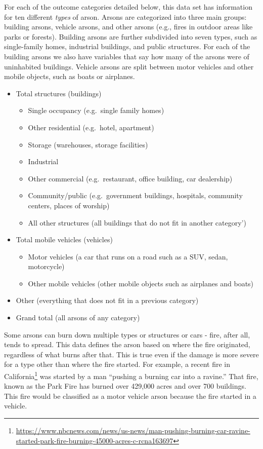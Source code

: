 \documentclass[
]{krantz}
\providecommand{\tightlist}{%
  \setlength{\itemsep}{0pt}\setlength{\parskip}{0pt}}
\renewcommand{\href}[2]{#2\footnote{\url{#1}}}
\begin{document}
For each of the outcome categories detailed below, this
data set has information for ten different \emph{types} of
arson. Arsons are categorized into three main groups:
building arsons, vehicle arsons, and other arsons (e.g.,
fires in outdoor areas like parks or forests). Building
arsons are further subdivided into seven types, such as
single-family homes, industrial buildings, and public
structures. For each of the building arsons we also have
variables that say how many of the arsons were of
uninhabited buildings. Vehicle arsons are split between
motor vehicles and other mobile objects, such as boats or
airplanes.

\begin{itemize}
\tightlist
\item
  Total structures (buildings)

  \begin{itemize}
  \tightlist
  \item
    Single occupancy (e.g.~single family homes)
  \item
    Other residential (e.g.~hotel, apartment)
  \item
    Storage (warehouses, storage facilities)
  \item
    Industrial
  \item
    Other commercial (e.g.~restaurant, office building, car
    dealership)
  \item
    Community/public (e.g.~government buildings, hospitals,
    community centers, places of worship)
  \item
    All other structures (all buildings that do not fit in
    another category')
  \end{itemize}
\item
  Total mobile vehicles (vehicles)

  \begin{itemize}
  \tightlist
  \item
    Motor vehicles (a car that runs on a road such as a SUV,
    sedan, motorcycle)
  \item
    Other mobile vehicles (other mobile objects such as
    airplanes and boats)
  \end{itemize}
\item
  Other (everything that does not fit in a previous
  category)
\item
  Grand total (all arsons of any category)
\end{itemize}

Some arsons can burn down multiple types or structures or
cars - fire, after all, tends to spread. This data defines
the arson based on where the fire originated, regardless of
what burns after that. This is true even if the damage is
more severe for a type other than where the fire started.
For example, a
\href{https://www.nbcnews.com/news/us-news/man-pushing-burning-car-ravine-started-park-fire-burning-45000-acres-c-rcna163697}{recent
fire in California} was started by a man ``pushing a burning
car into a ravine.'' That fire, known as the Park Fire has
burned over 429,000 acres and over 700 buildings. This fire
would be classified as a motor vehicle arson because the
fire started in a vehicle.
\end{document}
